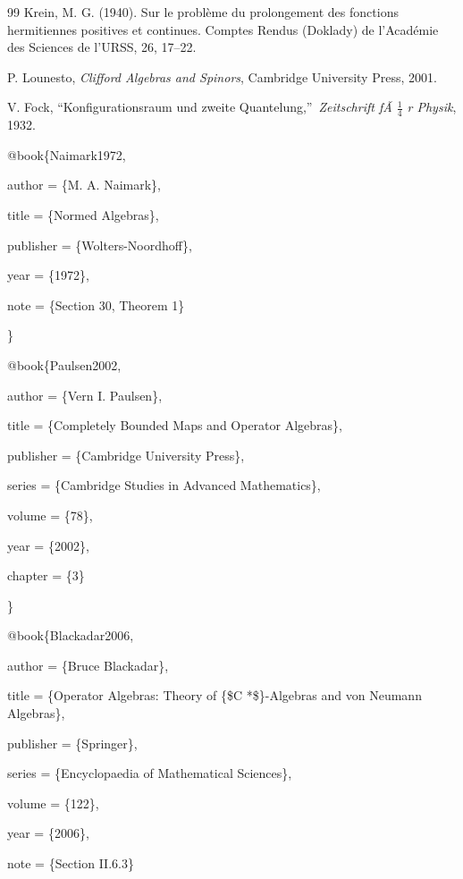 \documentclass[aps,preprint]{revtex4}
\begin{document}
\begin{thebibliography}{99}
 Krein, M. G. (1940). Sur le probl\`{e}me du prolongement des
fonctions hermitiennes positives et continues. Comptes Rendus (Doklady) de
l'Acad\'{e}mie des Sciences de l'URSS, 26, 17--22.

 P. Lounesto, \textit{Clifford Algebras and Spinors},
Cambridge University Press, 2001.

 V. Fock, \textquotedblleft Konfigurationsraum und zweite
Quantelung,\textquotedblright\ \textit{Zeitschrift f\~{A}%
$\frac14$%
r Physik}, 1932.

\bibitem{} @book\{Naimark1972,

\bibitem{} author = \{M. A. Naimark\},

\bibitem{} title = \{Normed Algebras\},

\bibitem{} publisher = \{Wolters-Noordhoff\},

\bibitem{} year = \{1972\},

\bibitem{} note = \{Section 30, Theorem 1\}

\bibitem{} \}

\bibitem{} @book\{Paulsen2002,

\bibitem{} author = \{Vern I. Paulsen\},

\bibitem{} title = \{Completely Bounded Maps and Operator Algebras\},

\bibitem{} publisher = \{Cambridge University Press\},

\bibitem{} series = \{Cambridge Studies in Advanced Mathematics\},

\bibitem{} volume = \{78\},

\bibitem{} year = \{2002\},

\bibitem{} chapter = \{3\}

\bibitem{} \}

\bibitem{} @book\{Blackadar2006,

\bibitem{} author = \{Bruce Blackadar\},

\bibitem{} title = \{Operator Algebras: Theory of \{\$C%
*\$\}-Algebras and von Neumann Algebras\},

\bibitem{} publisher = \{Springer\},

\bibitem{} series = \{Encyclopaedia of Mathematical Sciences\},

\bibitem{} volume = \{122\},

\bibitem{} year = \{2006\},

\bibitem{} note = \{Section II.6.3\}


\end{thebibliography}
\end{document}
